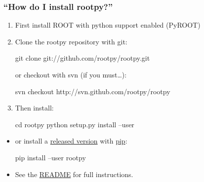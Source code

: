\documentclass[10pt,professionalfonts,serif,usenames,dvipsnames,svgnames,table]{beamer}
\begin{document}
\begin{frame}[fragile]
    \frametitle{``How do I install rootpy?''}
    \begin{enumerate}
        \item First install ROOT with python support enabled (PyROOT)
        \item Clone the rootpy repository with git:
\begin{pyglist}[language=bash,texcl=true,style=vim]
git clone git://github.com/rootpy/rootpy.git
\end{pyglist}
or checkout with svn (if you must\ldots):
\begin{pyglist}[language=bash,texcl=true,style=vim]
svn checkout http://svn.github.com/rootpy/rootpy
\end{pyglist}
        \item Then install:
\begin{pyglist}[language=bash,texcl=true,style=vim]
cd rootpy
python setup.py install --user
\end{pyglist}
\end{enumerate}
\begin{itemize}
    \item or install a \href{https://pypi.python.org/pypi/rootpy}{released version}
        with \href{https://pypi.python.org/pypi/pip}{pip}:
\begin{pyglist}[language=bash,texcl=true,style=vim]
pip install --user rootpy
\end{pyglist}
        \item See the
                \href{https://github.com/rootpy/rootpy/blob/master/README.rst}{README}
                for full instructions.
    \end{itemize}
\end{frame}
\end{document}
